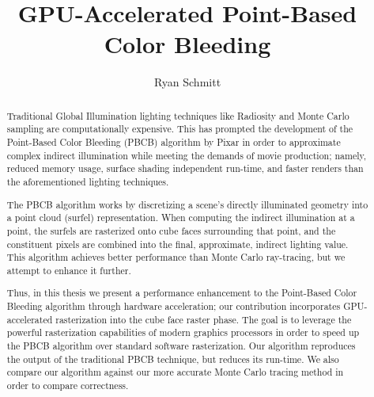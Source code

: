 \documentclass[12pt]{ucthesis}
\begin{document}

\title{GPU-Accelerated Point-Based Color Bleeding}
\author{Ryan Schmitt}
  
 
     



\maketitle

\begin{frontmatter}

\copyrightpage

\committeemembershippage

\begin{abstract}

Traditional Global Illumination lighting techniques like Radiosity and Monte Carlo sampling are computationally expensive. This has prompted the development of the Point-Based Color Bleeding (PBCB) algorithm by Pixar in order to approximate complex indirect illumination while meeting the demands of movie production; namely, reduced memory usage, surface shading independent run-time, and faster renders than the aforementioned lighting techniques.

The PBCB algorithm works by discretizing a scene’s directly illuminated geometry into a point cloud (surfel) representation. When computing the indirect illumination at a point, the surfels are rasterized onto cube faces surrounding that point, and the constituent pixels are combined into the final, approximate, indirect lighting value. This algorithm achieves better performance than Monte Carlo ray-tracing, but we attempt to enhance it further.

Thus, in this thesis we present a performance enhancement to the Point-Based Color Bleeding algorithm through hardware acceleration; our contribution incorporates GPU-accelerated rasterization into the cube face raster phase. The goal is to leverage the powerful rasterization capabilities of modern graphics processors in order to speed up the PBCB algorithm over standard software rasterization. Our algorithm reproduces the output of the traditional PBCB technique, but reduces its run-time. We also compare our algorithm against our more accurate Monte Carlo tracing method in order to compare correctness.


\end{abstract}
\end{frontmatter}
\end{document}
